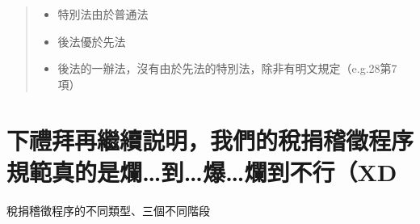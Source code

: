 \documentclass[]{ctexbook}
\providecommand{\tightlist}{%
  \setlength{\itemsep}{0pt}\setlength{\parskip}{0pt}}
\begin{document}
\begin{quote}
\begin{itemize}
\tightlist
\item
  特別法由於普通法
\item
  後法優於先法
\item
  後法的一辦法，沒有由於先法的特別法，除非有明文規定（e.g.28第7項）
\end{itemize}
\end{quote}

\hypertarget{ux4e0bux79aeux62dcux518dux7e7cux7e8cux8aacux660eux6211ux5011ux7684ux7a05ux6350ux7a3dux5fb5ux7a0bux5e8fux898fux7bc4ux771fux7684ux662fux721bux5230ux7206ux721bux5230ux4e0dux884cxd}{%
\section{下禮拜再繼續説明，我們的稅捐稽徵程序規範真的是爛\ldots 到\ldots 爆\ldots 爛到不行（XD}\label{ux4e0bux79aeux62dcux518dux7e7cux7e8cux8aacux660eux6211ux5011ux7684ux7a05ux6350ux7a3dux5fb5ux7a0bux5e8fux898fux7bc4ux771fux7684ux662fux721bux5230ux7206ux721bux5230ux4e0dux884cxd}}

稅捐稽徵程序的不同類型、三個不同階段



\backmatter
\printindex
\end{document}
